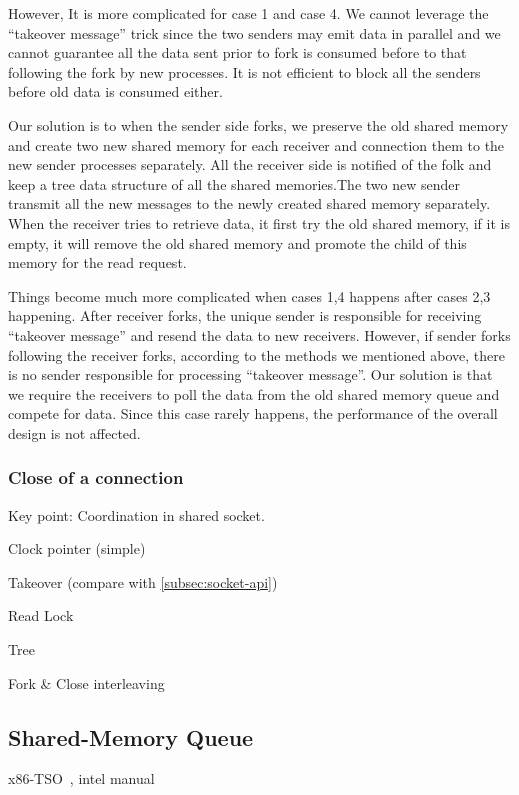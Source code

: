 However, It is more complicated for case 1 and case 4. We cannot leverage the ``takeover message'' trick since the two senders may emit data in parallel and we cannot guarantee all the data sent prior to fork is consumed before to that following the fork by new processes. It is not efficient to block all the senders before old data is consumed either.

Our solution is to when the sender side forks, we preserve the old shared memory and create two new shared memory for each receiver and connection them to the new sender processes separately. All the receiver side is notified of the folk and keep a tree data structure of all the shared memories.The two new sender transmit all the new messages to the newly created shared memory separately. When the receiver tries to retrieve data, it first try the old shared memory, if it is empty, it will remove the old shared memory and promote the child of this memory for the read request. 

Things become much more complicated when cases 1,4 happens after cases 2,3 happening. After receiver forks, the unique sender is responsible for receiving ``takeover message'' and resend the data to new receivers. However, if sender forks following the receiver forks, according to the methods we mentioned above, there is no sender responsible for processing ``takeover message''. Our solution is that we require the receivers to poll the data from the old shared memory queue and compete for data. Since this case rarely happens, the performance of the overall design is not affected.

\subsubsection{Close of a connection}
  
Key point: Coordination in shared socket.

Clock pointer (simple)

Takeover (compare with \ref{subsec:socket-api})

Read Lock

Tree

Fork \& Close interleaving

\subsection{Shared-Memory Queue}

x86-TSO~\cite{sewell2010x86}, intel manual~\cite{intel-manual}

